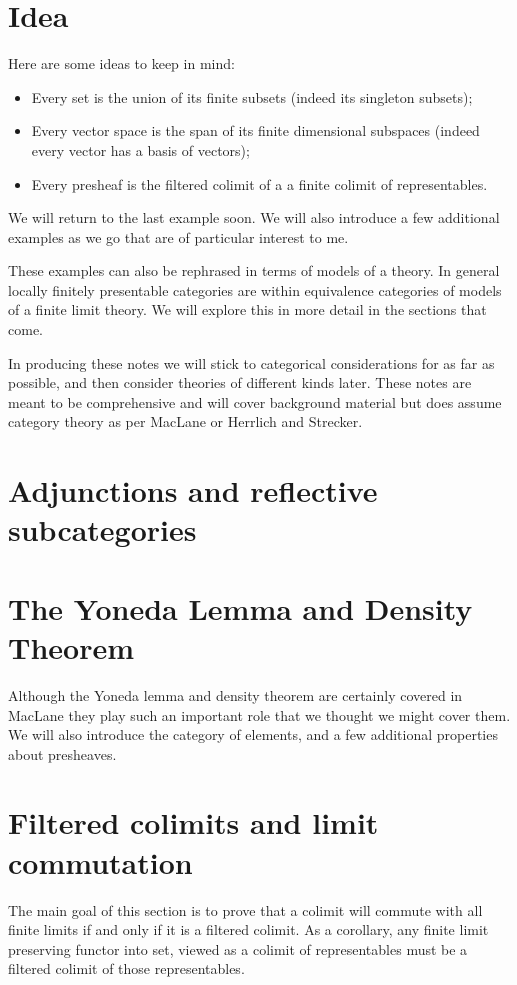 \documentclass{article}
\newcommand{\<}{\left\langle}
\renewcommand{\>}{\right\rangle}
\begin{document}
\section{Idea}

Here are some ideas to keep in mind:
\begin{itemize}
    \item Every set is the union of its finite subsets (indeed its singleton subsets);
    \item Every vector space is the span of its finite dimensional subspaces (indeed every vector has a basis of vectors);
    \item Every presheaf is the filtered colimit of a a finite colimit of representables.
\end{itemize}
We will return to the last example soon.  We will also introduce a few additional 
examples as we go that are of particular interest to me.

These examples can also be rephrased 
in terms of models of a theory.  In general locally finitely presentable 
categories are within equivalence categories of models of a finite limit 
theory.  We will explore this in more detail in the sections that come.

In producing these notes we will stick to categorical considerations for as 
far as possible, and then consider theories of different kinds later.  These 
notes are meant to be comprehensive and will cover background material but 
does assume category theory as per MacLane or Herrlich and Strecker.

\section{Adjunctions and reflective subcategories}

\section{The Yoneda Lemma and Density Theorem}
Although the Yoneda lemma and density theorem are certainly covered in 
MacLane they play such an important role that we thought we might cover them.
We will also introduce the category of elements, and a few additional properties 
about presheaves.

\section{Filtered colimits and limit commutation}
The main goal of this section is to prove that a colimit will commute 
with all finite limits if and only if it is a filtered colimit.  As a 
corollary, any finite limit preserving functor into set, viewed as a colimit 
of representables must be a filtered colimit of those representables.
\end{document}
